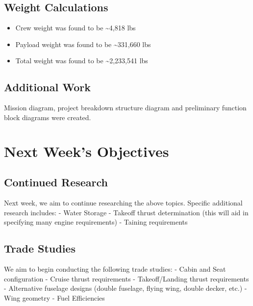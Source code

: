 \documentclass[10pt]{article}
\begin{document}
\subsection{Weight Calculations}\label{weight-calculations}

\begin{itemize}
\tightlist
\item
  Crew weight was found to be \textasciitilde4,818 lbs
\item
  Payload weight was found to be \textasciitilde331,660 lbs
\item
  Total weight was found to be \textasciitilde2,233,541 lbs
\end{itemize}

\subsection{Additional Work}\label{additional-work}

Mission diagram, project breakdown structure diagram and preliminary
function block diagrams were created.

\section{Next Week's Objectives}\label{next-weeks-objectives}

\subsection{Continued Research}\label{continued-research}

Next week, we aim to continue researching the above topics. Specific
additional research includes: - Water Storage - Takeoff thrust
determination (this will aid in specifying many engine requirements) -
Taining requirements

\subsection{Trade Studies}\label{trade-studies}

We aim to begin conducting the following trade studies: - Cabin and Seat
configuration - Cruise thrust requirements - Takeoff/Landing thrust
requirements - Alternative fuselage designs (double fuselage, flying
wing, double decker, etc.) - Wing geometry - Fuel Efficiencies
\end{document}
